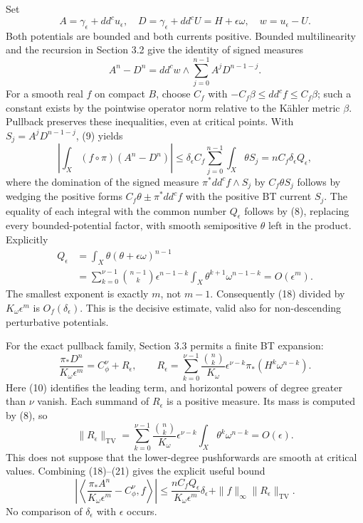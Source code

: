 \documentclass[
  11pt,
]{article}
\begin{document}
Set \[
A=\gamma_\epsilon+dd^c u_\epsilon,\quad
D=\gamma_\epsilon+dd^c U=H+\epsilon\omega,\quad w=u_\epsilon-U.
\] Both potentials are bounded and both currents positive. Bounded multilinearity and the recursion in Section 3.2 give the identity of signed measures \[
A^n-D^n=dd^cw\wedge\sum_{j=0}^{n-1}A^jD^{n-1-j}.                   \tag{17}
\] For a smooth real \(f\) on compact \(B\), choose \(C_f\) with \(-C_f\beta\leq dd^cf\leq C_f\beta\); such a constant exists by the pointwise operator norm relative to the Kähler metric \(\beta\). Pullback preserves these inequalities, even at critical points. With \(S_j=A^jD^{n-1-j}\), (9) yields \[
\left|\int_X(f\circ\pi)(A^n-D^n)\right|
\leq \delta_\epsilon C_f\sum_{j=0}^{n-1}\int_X\theta S_j
=nC_f\delta_\epsilon Q_\epsilon,                                  \tag{18}
\] where the domination of the signed measure \(\pi^*dd^cf\wedge S_j\) by \(C_f\theta S_j\) follows by wedging the positive forms \(C_f\theta\pm\pi^*dd^cf\) with the positive BT current \(S_j\). The equality of each integral with the common number \(Q_\epsilon\) follows by (8), replacing every bounded-potential factor, with smooth semipositive \(\theta\) left in the product. Explicitly \[
\begin{aligned}
Q_\epsilon&=\int_X\theta(\theta+\epsilon\omega)^{n-1}\\
&=\sum_{k=0}^{\nu-1}\binom{n-1}{k}\epsilon^{n-1-k}
\int_X\theta^{k+1}\omega^{n-1-k}
=O(\epsilon^m).
\end{aligned}                                                     \tag{19}
\] The smallest exponent is exactly \(m\), not \(m-1\). Consequently (18) divided by \(K_\omega\epsilon^m\) is \(O_f(\delta_\epsilon)\). This is the decisive estimate, valid also for non-descending perturbative potentials.

For the exact pullback family, Section 3.3 permits a finite BT expansion: \[
\frac{\pi_*D^n}{K_\omega\epsilon^m}=C_\phi^\nu+R_\epsilon,
\qquad
R_\epsilon=\sum_{k=0}^{\nu-1}
\frac{\binom nk}{K_\omega}\epsilon^{\nu-k}
\pi_*(H^k\omega^{n-k}).                                           \tag{20}
\] Here (10) identifies the leading term, and horizontal powers of degree greater than \(\nu\) vanish. Each summand of \(R_\epsilon\) is a positive measure. Its mass is computed by (8), so \[
\|R_\epsilon\|_{\mathrm{TV}}
=\sum_{k=0}^{\nu-1}\frac{\binom nk}{K_\omega}\epsilon^{\nu-k}
\int_X\theta^k\omega^{n-k}=O(\epsilon).                            \tag{21}
\] This does not suppose that the lower-degree pushforwards are smooth at critical values. Combining (18)--(21) gives the explicit useful bound \[
\left|\left\langle
\frac{\pi_*A^n}{K_\omega\epsilon^m}-C_\phi^\nu,f
\right\rangle\right|
\leq\frac{nC_fQ_\epsilon}{K_\omega\epsilon^m}\delta_\epsilon
+\|f\|_\infty\|R_\epsilon\|_{\mathrm{TV}}.                         \tag{22}
\] No comparison of \(\delta_\epsilon\) with \(\epsilon\) occurs.
\end{document}
